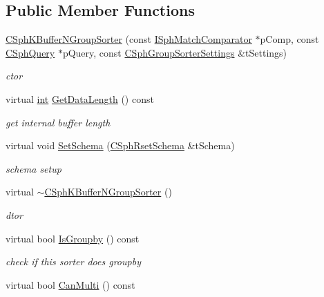 \subsection*{Public Member Functions}
\begin{DoxyCompactItemize}
\item 
\hyperlink{classCSphKBufferNGroupSorter_a04acf9564afee391ffe7ecfd25cc547d}{C\-Sph\-K\-Buffer\-N\-Group\-Sorter} (const \hyperlink{structISphMatchComparator}{I\-Sph\-Match\-Comparator} $\ast$p\-Comp, const \hyperlink{classCSphQuery}{C\-Sph\-Query} $\ast$p\-Query, const \hyperlink{structCSphGroupSorterSettings}{C\-Sph\-Group\-Sorter\-Settings} \&t\-Settings)
\begin{DoxyCompactList}\small\item\em ctor \end{DoxyCompactList}\item 
virtual \hyperlink{sphinxexpr_8cpp_a4a26e8f9cb8b736e0c4cbf4d16de985e}{int} \hyperlink{classCSphKBufferNGroupSorter_a43c873729cf4aad6433fae159a0f91b5}{Get\-Data\-Length} () const 
\begin{DoxyCompactList}\small\item\em get internal buffer length \end{DoxyCompactList}\item 
virtual void \hyperlink{classCSphKBufferNGroupSorter_a0933e14998dd98197b30de0cc596890a}{Set\-Schema} (\hyperlink{classCSphRsetSchema}{C\-Sph\-Rset\-Schema} \&t\-Schema)
\begin{DoxyCompactList}\small\item\em schema setup \end{DoxyCompactList}\item 
virtual \hyperlink{classCSphKBufferNGroupSorter_a440dbd7acaeaf22adf77207aeb8a8ee7}{$\sim$\-C\-Sph\-K\-Buffer\-N\-Group\-Sorter} ()
\begin{DoxyCompactList}\small\item\em dtor \end{DoxyCompactList}\item 
virtual bool \hyperlink{classCSphKBufferNGroupSorter_a64817c349eb21b9eedc299af3630575a}{Is\-Groupby} () const 
\begin{DoxyCompactList}\small\item\em check if this sorter does groupby \end{DoxyCompactList}\item 
virtual bool \hyperlink{classCSphKBufferNGroupSorter_a4f83ef27b945497d8000a61c932a6e81}{Can\-Multi} () const 
\item 

\end{DoxyCompactItemize}
